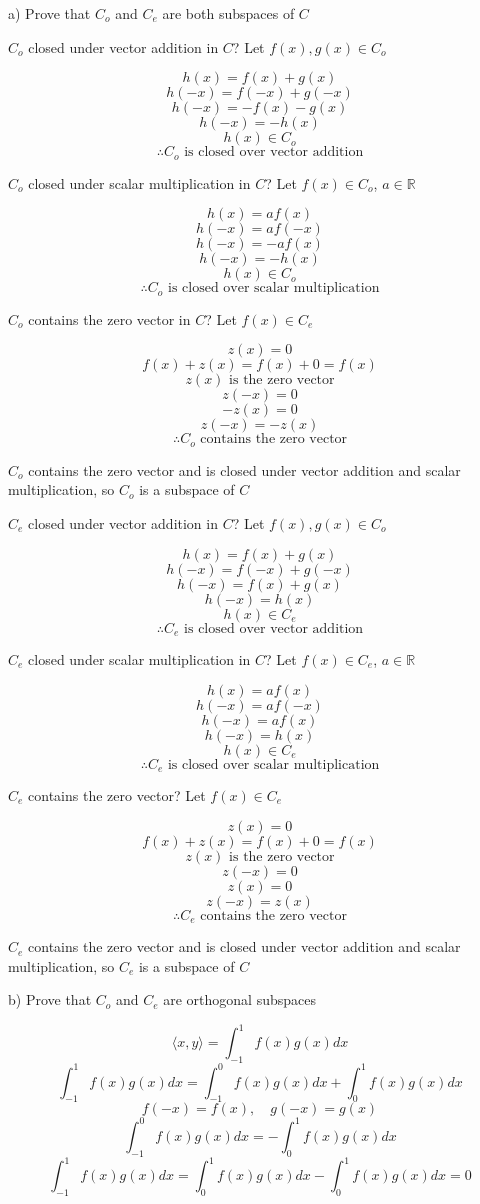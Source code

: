 \documentclass[12pt]{article}
\begin{document}
\begin{enumerate}
a) Prove that $C_o$ and $C_e$ are both subspaces of $C$

$C_o$ closed under vector addition in $C$? Let $f(x),g(x)\in C_o$

\[h(x)=f(x)+g(x)\]
\[h(-x)=f(-x)+g(-x)\]
\[h(-x)=-f(x)-g(x)\]
\[h(-x)=-h(x)\]
\[h(x)\in C_o\]
\[\therefore C_o\text{ is closed over vector addition}\]

$C_o$ closed under scalar multiplication in $C$? Let $f(x)\in C_o$, $a\in \mathbb{R}$

\[h(x)=a f(x)\]
\[h(-x)=af(-x)\]
\[h(-x)=-af(x)\]
\[h(-x)=-h(x)\]
\[h(x)\in C_o\]
\[\therefore C_o\text{ is closed over scalar multiplication}\]

$C_o$ contains the zero vector in $C$? Let $f(x)\in C_e$

\[z(x)=0\]
\[f(x) + z(x) = f(x) + 0 = f(x)\]
\[z(x)\text{ is the zero vector}\]
\[z(-x) = 0\]
\[-z(x) = 0\]
\[z(-x) = -z(x)\]
\[\therefore C_o\text{ contains the zero vector}\]

\begin{framed}
$C_o$ contains the zero vector and is closed under vector addition and scalar multiplication, so
$C_o$ is a subspace of $C$
\end{framed}

$C_e$ closed under vector addition in $C$? Let $f(x),g(x)\in C_o$

\[h(x)=f(x)+g(x)\]
\[h(-x)=f(-x)+g(-x)\]
\[h(-x)=f(x)+g(x)\]
\[h(-x)=h(x)\]
\[h(x)\in C_e\]
\[\therefore C_e\text{ is closed over vector addition}\]

$C_e$ closed under scalar multiplication in $C$? Let $f(x)\in C_e$, $a\in \mathbb{R}$

\[h(x)=a f(x)\]
\[h(-x)=af(-x)\]
\[h(-x)=af(x)\]
\[h(-x)=h(x)\]
\[h(x)\in C_e\]
\[\therefore C_e\text{ is closed over scalar multiplication}\]

$C_e$ contains the zero vector? Let $f(x)\in C_e$

\[z(x)=0\]
\[f(x) + z(x) = f(x) + 0 = f(x)\]
\[z(x)\text{ is the zero vector}\]
\[z(-x) = 0\]
\[z(x) = 0\]
\[z(-x) = z(x)\]
\[\therefore C_e\text{ contains the zero vector}\]

\begin{framed}
$C_e$ contains the zero vector and is closed under vector addition and scalar multiplication, so
$C_e$ is a subspace of $C$
\end{framed}

b) Prove that $C_o$ and $C_e$ are orthogonal subspaces

\[\langle x,y\rangle=\int_{-1}^1f(x)g(x)dx\]
\[\int_{-1}^1f(x)g(x)dx=\int_{-1}^0f(x)g(x)dx+\int_0^1f(x)g(x)dx\]
\[f(-x)=f(x),\quad g(-x)=g(x)\]
\[\int_{-1}^0f(x)g(x)dx=-\int_0^1f(x)g(x)dx\]
\[\int_{-1}^1f(x)g(x)dx=\int_0^1f(x)g(x)dx-\int_0^1f(x)g(x)dx=0\]


\end{enumerate}
\end{document}
